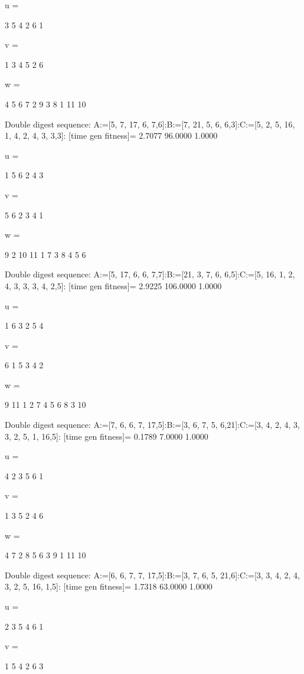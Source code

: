u =

     3     5     4     2     6     1


v =

     1     3     4     5     2     6


w =

     4     5     6     7     2     9     3     8     1    11    10

Double digest sequence:
A:=[5, 7, 17, 6, 7,6]:B:=[7, 21, 5, 6, 6,3]:C:=[5, 2, 5, 16, 1, 4, 2, 4, 3, 3,3]:
[time gen fitness]=
    2.7077   96.0000    1.0000


u =

     1     5     6     2     4     3


v =

     5     6     2     3     4     1


w =

     9     2    10    11     1     7     3     8     4     5     6

Double digest sequence:
A:=[5, 17, 6, 6, 7,7]:B:=[21, 3, 7, 6, 6,5]:C:=[5, 16, 1, 2, 4, 3, 3, 3, 4, 2,5]:
[time gen fitness]=
    2.9225  106.0000    1.0000


u =

     1     6     3     2     5     4


v =

     6     1     5     3     4     2


w =

     9    11     1     2     7     4     5     6     8     3    10

Double digest sequence:
A:=[7, 6, 6, 7, 17,5]:B:=[3, 6, 7, 5, 6,21]:C:=[3, 4, 2, 4, 3, 3, 2, 5, 1, 16,5]:
[time gen fitness]=
    0.1789    7.0000    1.0000


u =

     4     2     3     5     6     1


v =

     1     3     5     2     4     6


w =

     4     7     2     8     5     6     3     9     1    11    10

Double digest sequence:
A:=[6, 6, 7, 7, 17,5]:B:=[3, 7, 6, 5, 21,6]:C:=[3, 3, 4, 2, 4, 3, 2, 5, 16, 1,5]:
[time gen fitness]=
    1.7318   63.0000    1.0000


u =

     2     3     5     4     6     1


v =

     1     5     4     2     6     3


